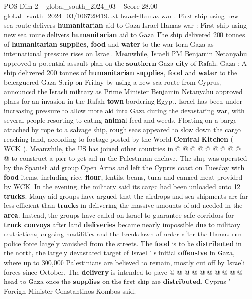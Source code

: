 \begin{textsample}{POS Dim 2 – global\_south\_2024\_03 – Score 28.00 – global\_south\_2024\_03/106720419.txt}  \label{ex:f2_pos_006}
Israel-Hamas war : First ship using new sea route delivers \textbf{humanitarian} aid to Gaza Israel-Hamas war : First ship using new sea route delivers \textbf{humanitarian} aid to Gaza The ship delivered 200 tonnes of \textbf{humanitarian} \textbf{supplies}, \textbf{food} and \textbf{water} to the war-torn Gaza as international pressure rises on Israel.
Meanwhile, Israeli PM Benjamin Netanyahu approved a potential assault plan on the \textbf{southern} Gaza \textbf{city} of Rafah.
Gaza : A ship delivered 200 tonnes of \textbf{humanitarian} \textbf{supplies}, \textbf{food} and \textbf{water} to the beleaguered Gaza Strip on Friday by using a new sea route from Cyprus, announced the Israeli military as Prime Minister Benjamin Netanyahu approved plans for an invasion in the Rafah \textbf{town} bordering Egypt.
Israel has been under increasing pressure to allow more aid into Gaza during the devastating war, with several people resorting to eating \textbf{animal} feed and weeds.
Floating on a barge attached by rope to a salvage ship, rough seas appeared to slow down the cargo reaching land, according to footage posted by the World \textbf{Central} \textbf{Kitchen} ( WCK ).
Meanwhile, the US has joined other countries in @ @ @ @ @ @ @ @ @ @ to construct a pier to get aid in the Palestinian enclave.
The ship was operated by the Spanish aid group Open Arms and left the Cyprus coast on Tuesday with \textbf{food} items, including rice, \textbf{flour}, lentils, beans, tuna and canned meat provided by WCK.
In the evening, the military said its cargo had been unloaded onto 12 \textbf{trucks}.
Many aid groups have argued that the airdrops and sea shipments are far less efficient than \textbf{trucks} in delivering the massive amounts of aid needed in the \textbf{area}.
Instead, the groups have called on Israel to guarantee safe corridors for \textbf{truck} \textbf{convoys} after land \textbf{deliveries} became nearly impossible due to military restrictions, ongoing hostilities and the breakdown of order after the Hamas-run police force largely vanished from the streets.
The \textbf{food} is to be \textbf{distributed} in the north, the largely devastated target of Israel ' s initial \textbf{offensive} in Gaza, where up to 300,000 Palestinians are believed to remain, mostly cut off by Israeli forces since October.
The \textbf{delivery} is intended to pave @ @ @ @ @ @ @ @ @ @ head to Gaza once the \textbf{supplies} on the first ship are \textbf{distributed}, Cyprus ' Foreign Minister Constantinos Kombos said.

\end{textsample}

